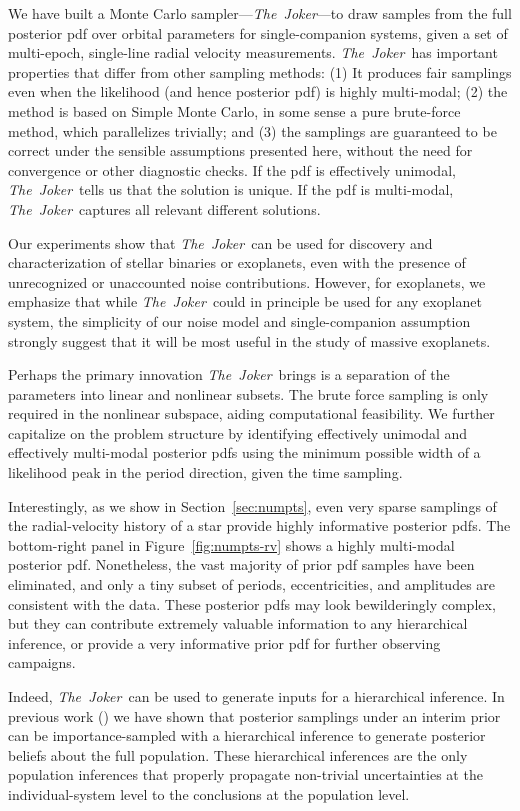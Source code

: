 \documentclass[manuscript, letterpaper]{aastex6}
\newcommand{\project}[1]{\textsl{#1}}
\newcommand{\samplername}{\project{The~Joker}}
\newcommand{\sectionname}{Section}
\newcommand{\figname}{Figure}
\begin{document}
We have built a Monte Carlo sampler---\samplername---to draw samples from the
full posterior pdf over orbital parameters for single-companion systems,
given a set of multi-epoch, single-line radial velocity measurements.
\samplername\ has important properties that differ from other sampling methods:
(1) It produces fair samplings even when the likelihood (and hence posterior
pdf) is highly multi-modal; (2) the method is based on Simple Monte Carlo,  in
some sense a pure brute-force method, which parallelizes trivially; and (3) the
samplings are guaranteed to be correct under the sensible assumptions presented here,
without the need for convergence or other diagnostic checks.
If the pdf is effectively unimodal, \samplername\ tells us that the solution is
unique.
If the pdf is multi-modal, \samplername\ captures all relevant different
solutions.

Our experiments show that \samplername\ can be used for discovery and
characterization of stellar binaries or exoplanets, even with the presence of
unrecognized or unaccounted noise contributions.
However, for exoplanets, we emphasize that while \samplername\ could in
principle be used for any exoplanet system, the simplicity of our noise model
and single-companion assumption strongly suggest that it will be most useful in
the study of massive exoplanets.

Perhaps the primary innovation \samplername\ brings is a separation of the
parameters into linear and nonlinear subsets.
The brute force sampling is only required in the nonlinear subspace, aiding
computational feasibility.
We further capitalize on the problem structure by identifying effectively
unimodal and effectively multi-modal posterior pdfs using the minimum possible
width of a likelihood peak in the period direction, given the time sampling.

Interestingly, as we show in \sectionname~\ref{sec:numpts}, even very sparse
samplings of the radial-velocity history of a star provide highly
informative posterior pdfs.  The bottom-right panel in
\figname~\ref{fig:numpts-rv} shows a highly multi-modal posterior pdf.
Nonetheless, the vast majority of prior pdf samples have been eliminated, and
only a tiny subset of periods, eccentricities, and amplitudes are consistent
with the data.
These posterior pdfs may look bewilderingly complex, but they can contribute
extremely valuable information to any hierarchical inference, or
provide a very informative prior pdf for further observing campaigns.

Indeed, \samplername\  can be used to generate inputs for a hierarchical inference.
In previous work (\citealt{Hogg:2010, Foreman-Mackey:2014}) we have shown
that posterior samplings under an interim prior can be importance-sampled
with a hierarchical inference to generate posterior beliefs about the
full population.
These hierarchical inferences are the only population inferences
that properly propagate non-trivial uncertainties at the
individual-system level to the conclusions at the population level.
\end{document}
